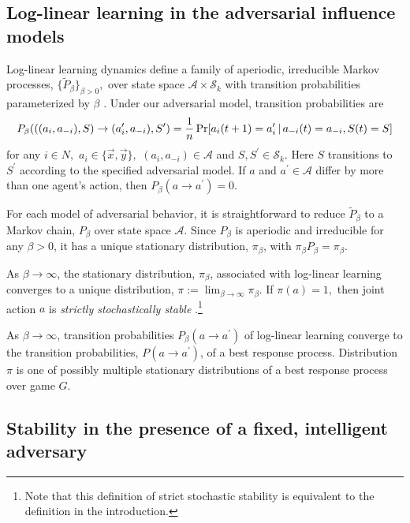 \subsection{Log-linear learning in the adversarial influence models}\label{a:LLL Markov}

Log-linear learning dynamics define a family of aperiodic, irreducible Markov processes, $\{\tilde{P}_\beta\}_{\beta>0},$ over state space $\mathcal{A}\times\mathcal{S}_k$ with transition probabilities parameterized by $\beta$ \cite{Blume1993}. Under our adversarial model, transition probabilities are
\begin{align}
P_\beta(((a_i,a_{-i}), S)\to (a_i^\prime,a_{-i}),S^\prime)= {1\over n}\Pr[a_i(t+1) = a_i^\prime\,|\,a_{-i}(t) = a_{-i}, S(t) = S]
\end{align}
for any $i\in N,$ $a_i\in \{\vec{x},\vec{y}\},$  $(a_i,a_{-i})\in\mathcal{A}$ and $S,S^\prime\in\mathcal{S}_k$. Here $S$ transitions to $S^\prime$ according to the specified adversarial model. If $a$ and $a^\prime\in\mathcal{A}$ differ by more than one agent's action, then $P_\beta(a\to a^\prime) = 0$. 

For each model of adversarial behavior, it is straightforward to reduce $\tilde{P}_\beta$ to a Markov chain, $P_\beta$ over state space $\mathcal{A}$.
Since $P_\beta$  is aperiodic and irreducible for any $\beta >0$, it has a unique stationary distribution, $\pi_\beta$, with $\pi_\beta P_\beta = \pi_\beta$. 

As $\beta\to\infty$, the stationary distribution, $\pi_\beta$, associated with log-linear learning converges to a unique distribution,
$\pi := \lim_{\beta\to\infty} \pi_\beta.$  
If %
$\pi(a) = 1,$ then joint action $a$ is \emph{strictly stochastically stable} \cite{Foster1990}.\footnote{Note that this definition of strict stochastic stability is equivalent to the definition  in the introduction.}


As $\beta\to \infty$, transition probabilities $P_\beta(a\to a^\prime)$ of  log-linear learning converge to the transition probabilities, $P(a\to a^\prime)$, of a best response process.  
Distribution $\pi$ is one of possibly multiple stationary distributions of a best response process over game $G$. %

\subsection{Stability in the presence of a fixed, intelligent adversary}\label{a:fixed line graph proofs}

